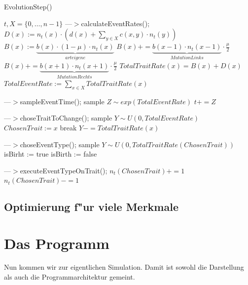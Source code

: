 \documentclass[11pt, a4paper, german]{article}
\begin{document}
	\begin{algorithm}[H]
		\caption{EvolutionStep()}
		\begin{algorithmic}[1]
			\REQUIRE $ t, X = \{0,\dots, n-1\} $
			\STATE ---$>$calculateEventRates();
				\STATE $  D(x) := n_t(x) \cdot \left( d(x) + \sum_{y \in X} c(x,y) \cdot n_t(y) \right) $
				\STATE $ B(x) := \underbrace{b(x) \cdot (1 - \mu) \cdot n_t(x)}_{arteigene}  $
					\STATE $ B(x) += \underbrace{b(x-1)\cdot n_t(x-1)}_{Mutation Links} \cdot \frac{\mu}{2} $
				\ENDIF
					\STATE $ B(x) += \underbrace{b(x+1)\cdot n_t(x+1)}_{Mutation Rechts} \cdot \frac{\mu}{2} $
				\ENDIF
				\STATE $ TotalTraitRate(x) = B(x) + D(x) $
			\ENDFOR
			\STATE $ TotalEventRate := \sum_{x \in X} TotalTraitRate(x) $
			
			\STATE ---$>$sampleEventTime();
			\STATE sample $ Z \sim exp(TotalEventRate) $
			\STATE $ t += Z $
			
			\STATE ---$>$choseTraitToChange();
			\STATE sample $ Y \sim U(0,TotalEventRate) $
					\STATE $ ChosenTrait := x $
					\STATE break
				\ENDIF
				\STATE $ Y -= TotalTraitRate(x) $
			\ENDFOR
			
			\STATE ---$>$choseEventType();
			\STATE sample $ Y \sim U(0,TotalTraitRate(ChosenTrait)) $
				\STATE isBirht := true
			\ELSE
				\STATE isBirth := false
			\ENDIF
			
			\STATE ---$>$executeEventTypeOnTrait();
				\STATE $ n_t(ChosenTrait) += 1 $
			\ELSE
					\STATE $ n_t(ChosenTrait) -= 1 $
				\ENDIF
			\ENDIF
		\end{algorithmic}
	\end{algorithm}
	
	\subsection{Optimierung f"ur viele Merkmale}
	
\clearpage

\section{Das Programm}

Nun kommen wir zur eigentlichen Simulation. Damit ist sowohl die Darstellung als auch die Programmarchitektur gemeint. 
\end{document}
